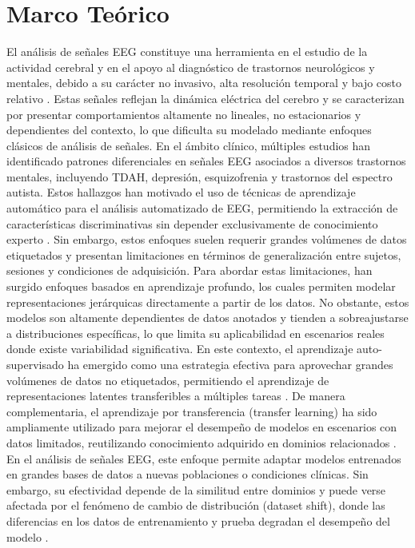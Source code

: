 \section{Marco Teórico}

El análisis de señales EEG constituye una herramienta en el estudio de la actividad cerebral y en el apoyo al diagnóstico de trastornos neurológicos y mentales, debido a su carácter no invasivo, alta resolución temporal y bajo costo relativo \cite{Nunez2006,Acharya2016}. Estas señales reflejan la dinámica eléctrica del cerebro y se caracterizan por presentar comportamientos altamente no lineales, no estacionarios y dependientes del contexto, lo que dificulta su modelado mediante enfoques clásicos de análisis de señales.
En el ámbito clínico, múltiples estudios han identificado patrones diferenciales en señales EEG asociados a diversos trastornos mentales, incluyendo TDAH, depresión, esquizofrenia y trastornos del espectro autista. Estos hallazgos han motivado el uso de técnicas de aprendizaje automático para el análisis automatizado de EEG, permitiendo la extracción de características discriminativas sin depender exclusivamente de conocimiento experto \cite{Craik2019,Bashivan2016}. Sin embargo, estos enfoques suelen requerir grandes volúmenes de datos etiquetados y presentan limitaciones en términos de generalización entre sujetos, sesiones y condiciones de adquisición.
Para abordar estas limitaciones, han surgido enfoques basados en aprendizaje profundo, los cuales permiten modelar representaciones jerárquicas directamente a partir de los datos. No obstante, estos modelos son altamente dependientes de datos anotados y tienden a sobreajustarse a distribuciones específicas, lo que limita su aplicabilidad en escenarios reales donde existe variabilidad significativa. En este contexto, el aprendizaje auto-supervisado ha emergido como una estrategia efectiva para aprovechar grandes volúmenes de datos no etiquetados, permitiendo el aprendizaje de representaciones latentes transferibles a múltiples tareas \cite{Mathew2024,Abbaspourazad2023}.
De manera complementaria, el aprendizaje por transferencia (transfer learning) ha sido ampliamente utilizado para mejorar el desempeño de modelos en escenarios con datos limitados, reutilizando conocimiento adquirido en dominios relacionados \cite{Pan2010}. En el análisis de señales EEG, este enfoque permite adaptar modelos entrenados en grandes bases de datos a nuevas poblaciones o condiciones clínicas. Sin embargo, su efectividad depende de la similitud entre dominios y puede verse afectada por el fenómeno de cambio de distribución (dataset shift), donde las diferencias en los datos de entrenamiento y prueba degradan el desempeño del modelo \cite{MorenoTorres2012}.
